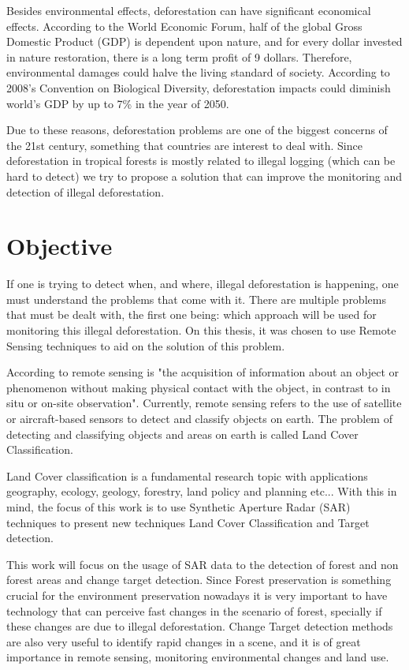 Besides environmental effects, deforestation can have significant economical effects. According to the World Economic Forum, half of the global Gross Domestic Product (GDP)
is dependent upon nature, and for every dollar invested in nature restoration, there is a long term profit of 9 dollars. Therefore, environmental damages could halve the living standard of society.
According to 2008's Convention on Biological Diversity, deforestation impacts could diminish world's GDP by up to 7\% in the year of 2050.

Due to these reasons, deforestation problems are one of the biggest concerns of the 21st century, something that countries are interest to deal with. Since deforestation in tropical forests is mostly related to illegal
logging (which can be hard to detect) we try to propose a solution that can improve the monitoring and detection of illegal deforestation.

\section{Objective}

If one is trying to detect when, and where, illegal deforestation is happening, one must understand the problems that come with it. There are multiple problems that must be dealt with, the first one being: which approach will be used for
monitoring this illegal deforestation. On this thesis, it was chosen to use Remote Sensing techniques to aid on the solution of this problem.

According to \cite{Schott1996RemoteST} remote sensing is "the acquisition of information about an object or phenomenon without making physical contact with the object, in contrast to in situ or on-site observation". Currently, remote sensing
refers to the use of satellite or aircraft-based sensors to detect and classify objects on earth. The problem of detecting and classifying objects and areas on earth is called Land Cover Classification.

Land Cover classification is a fundamental research topic with applications geography,
ecology, geology, forestry, land policy and planning etc... With this in mind, the focus of this work is to use Synthetic Aperture Radar (SAR) techniques to present
new techniques Land Cover Classification and Target detection.

This work will focus on the usage of SAR data to the detection of forest and non
forest areas and change target detection. Since Forest preservation is something crucial
for the environment preservation nowadays it is very important to have technology that
can perceive fast changes in the scenario of forest, specially if these changes are due to
illegal deforestation. Change Target detection methods are also very useful to identify
rapid changes in a scene, and it is of great importance in remote sensing, monitoring
environmental changes and land use.

